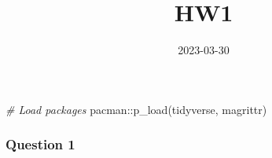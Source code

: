 \documentclass[
]{article}
\title{HW1}
\author{}
\date{\vspace{-2.5em}2023-03-30}
\newenvironment{Shaded}{\begin{snugshade}}{\end{snugshade}}
\newcommand{\CommentTok}[1]{\textcolor[rgb]{0.56,0.35,0.01}{\textit{#1}}}
\newcommand{\FunctionTok}[1]{\textcolor[rgb]{0.00,0.00,0.00}{#1}}
\newcommand{\NormalTok}[1]{#1}
\newcommand{\SpecialCharTok}[1]{\textcolor[rgb]{0.00,0.00,0.00}{#1}}
\begin{document}
\maketitle

\begin{Shaded}
\begin{Highlighting}[]
\CommentTok{\# Load packages}
\NormalTok{pacman}\SpecialCharTok{::}\FunctionTok{p\_load}\NormalTok{(tidyverse, magrittr)}
\end{Highlighting}
\end{Shaded}

\hypertarget{question-1}{%
\subsubsection{Question 1}\label{question-1}}
\end{document}
